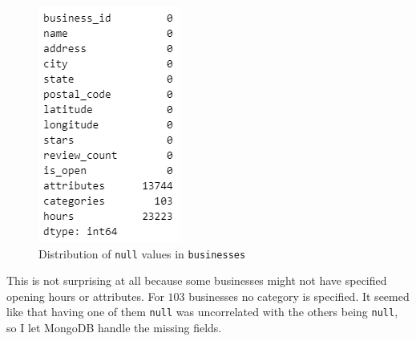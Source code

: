 \documentclass{Configuration_Files/PoliMi3i_thesis}
\begin{document}
\begin{figure}[H]
    \centering
    \includegraphics[width=1\columnwidth / 3]{imgs/null_count_businesses.png}
    \caption{Distribution of \texttt{null} values in \texttt{businesses}}
    \label{fig:null_count_businesses}
\end{figure}

\bigskip

This is not surprising at all because some businesses might not have specified opening hours or attributes. For $103$ businesses no category is specified. It seemed like that having one of them \texttt{null} was uncorrelated with the others being \texttt{null}, so I let MongoDB handle the missing fields.
\end{document}

